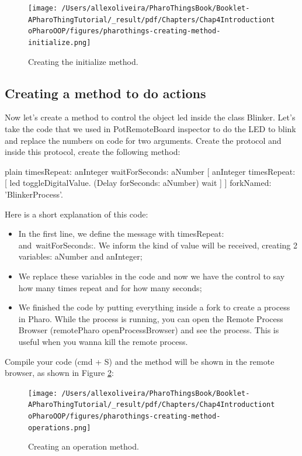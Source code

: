 \documentclass[10pt,twoside,english]{_support/latex/sbabook/sbabook}
\begin{document}
\begin{figure}

\begin{center}
\texttt{[image: /Users/allexoliveira/PharoThingsBook/Booklet-APharoThingTutorial/\_result/pdf/Chapters/Chap4IntroductiontoPharoOOP/figures/pharothings-creating-method-initialize.png]}\caption{Creating the initialize method.\label{InitializeMethod}}\end{center}
\end{figure}

\subsection{Creating a method to do actions}
Now let's create a method to control the object led inside the class Blinker. Let's take the code that we used in PotRemoteBoard inspector to do the LED to blink and replace the numbers on code for two arguments. Create the protocol  and inside this protocol, create the following method:

\begin{displaycode}{plain}
timesRepeat: anInteger waitForSeconds: aNumber
    [ anInteger timesRepeat: [  
        led toggleDigitalValue. 
        (Delay forSeconds: aNumber) wait  
    ] ] forkNamed: 'BlinkerProcess'.
\end{displaycode}

Here is a short explanation of this code:

\begin{itemize}
\item In the first line, we define the message with timesRepeat: and waitForSeconds:. We inform the kind of value will be received, creating 2 variables: aNumber and anInteger;
\item We replace these variables in the code and now we have the control to say how many times repeat and for how many seconds;
\item We finished the code by putting everything inside a fork to create a process in Pharo. While the process is running, you can open the Remote Process Browser (remotePharo openProcessBrowser) and see the process. This is useful when you wanna kill the remote process.
\end{itemize}

Compile your code (cmd + S) and  the method will be shown in the remote browser, as shown in Figure \ref{OperationsMethod}:


\begin{figure}

\begin{center}
\texttt{[image: /Users/allexoliveira/PharoThingsBook/Booklet-APharoThingTutorial/\_result/pdf/Chapters/Chap4IntroductiontoPharoOOP/figures/pharothings-creating-method-operations.png]}\caption{Creating an operation method.\label{OperationsMethod}}\end{center}
\end{figure}
\end{document}
